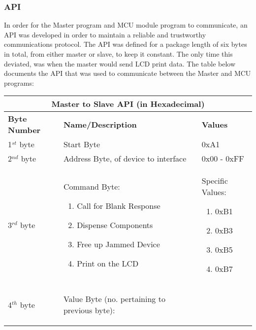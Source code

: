 \documentclass[a4paper,11pt]{article}
\numberwithin{figure}{section}
\numberwithin{table}{section}
\begin{document}
\subsubsection{API}
\label{subsubsec:API}
In order for the Master program and MCU module program to communicate, an API was developed in order to maintain a reliable and trustworthy communications protocol. The API was defined for a package length of six bytes in total, from either master or slave, to keep it constant. The only time this deviated, was when the master would send LCD print data. The table below documents the API that was used to communicate between the Master and MCU programs:

		\begin{table}[ht]
			\centering
			\begin{tabular}{| m{3cm} | m{5cm}| m{5cm} |}
			\hline
			\multicolumn{3}{|c|}{\bfseries Master to Slave API (in Hexadecimal)}\\
			\hline
			\bfseries{Byte Number}  & \bfseries{Name/Description} & \bfseries{Values} \\
			\hline
			1$^{st}$ byte & Start Byte & 0xA1\\
			\hline
			2$^{nd}$ byte & Address Byte, of device to interface & 0x00 - 0xFF \\
			\hline
			3$^{rd}$ byte & Command Byte: {\begin{enumerate}[nosep]			
											\setlength{\itemsep}{0pt}
   											\setlength{\parskip}{0pt}
    										\setlength{\parsep}{0pt}  
											\item Call for Blank Response
											\item Dispense Components
											\item Free up Jammed Device
											\item Print on the LCD
										\end{enumerate}}	& Specific Values: \begin{enumerate}[nosep]	
																			\setlength{\itemsep}{0pt}
   																			\setlength{\parskip}{0pt}
    																		\setlength{\parsep}{0pt}	
																			\item 0xB1
																			\item 0xB3
																			\item 0xB5
																			\item 0xB7
																			\end{enumerate} \\
			\hline
			4$^{th}$ byte & Value Byte (no. pertaining to previous byte): \begin{enumerate}[nosep]	

\end{enumerate}
\end{tabular}
\end{table}
\end{document}
